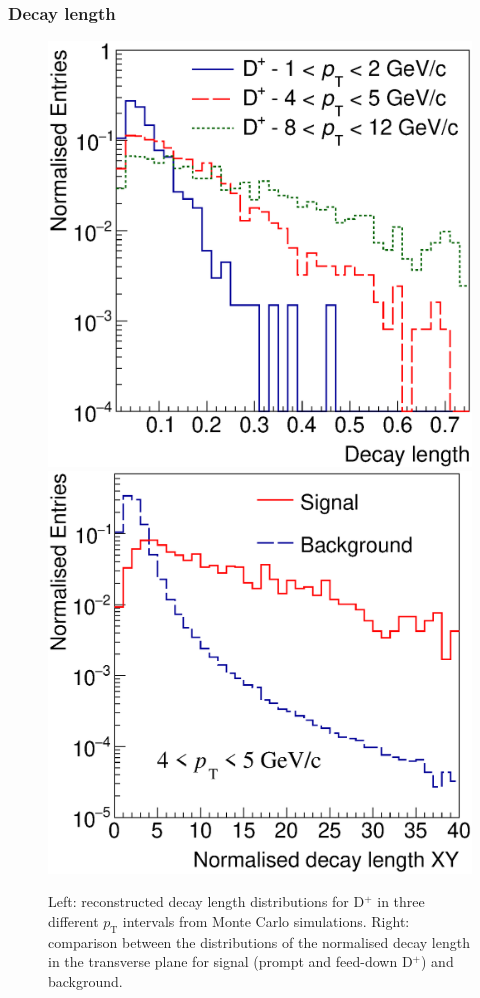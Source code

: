 \documentclass[b5paper,10pt,twoside,oldstyle,classica]{toptesi}
\newcommand{\pt}{p_\text{T}}
\begin{document}
\subsubsection{Decay length}
\begin{figure}[b]
\begin{center}
{\includegraphics[scale = 0.32]{DecLCompPt.eps}}
\hspace{-0.5cm}
{\includegraphics[scale = 0.32]{NormDecLComp_4-5.eps}}
\caption{Left: reconstructed decay length distributions for D$^+$ in three different $\pt$ intervals from Monte Carlo simulations. Right: comparison between the distributions of the normalised decay length in the transverse plane for signal (prompt and feed-down D$^+$) and background.}
\label{decl}
\end{center}
\end{figure}
\end{document}
